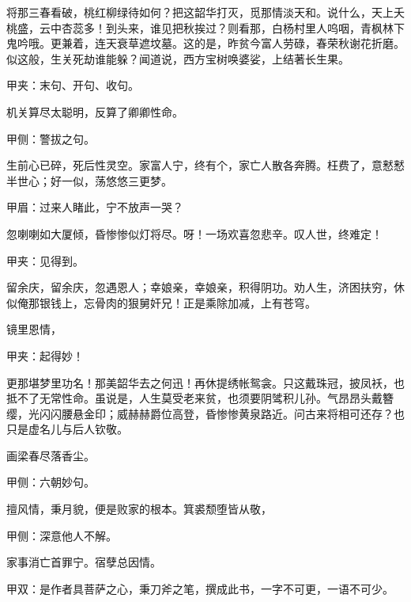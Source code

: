 \begin{qute}
    将那三春看破，桃红柳绿待如何？把这韶华打灭，觅那情淡天和。说什么，天上夭桃盛，云中杏蕊多！到头来，谁见把秋挨过？则看那，白杨村里人呜咽，青枫林下鬼吟哦。更兼着，连天衰草遮坟墓。这的是，昨贫今富人劳碌，春荣秋谢花折磨。似这般，生关死劫谁能躲？闻道说，西方宝树唤婆娑，上结著长生果。\begin{note}甲夹：末句、开句、收句。\end{note}
\end{qute}


\begin{qute}
    机关算尽太聪明，反算了卿卿性命。\begin{note}甲侧：警拔之句。\end{note}生前心已碎，死后性灵空。家富人宁，终有个，家亡人散各奔腾。枉费了，意慭慭半世心；好一似，荡悠悠三更梦。\begin{note}甲眉：过来人睹此，宁不放声一哭？\end{note}忽喇喇如大厦倾，昏惨惨似灯将尽。呀！一场欢喜忽悲辛。叹人世，终难定！\begin{note}甲夹：见得到。\end{note}
\end{qute}


\begin{qute}
    留余庆，留余庆，忽遇恩人；幸娘亲，幸娘亲，积得阴功。劝人生，济困扶穷，休似俺那银钱上，忘骨肉的狠舅奸兄！正是乘除加减，上有苍穹。
\end{qute}


\begin{qute}
    镜里恩情，\begin{note}甲夹：起得妙！\end{note}更那堪梦里功名！那美韶华去之何迅！再休提绣帐鸳衾。只这戴珠冠，披凤袄，也抵不了无常性命。虽说是，人生莫受老来贫，也须要阴骘积儿孙。气昂昂头戴簪缨，光闪闪腰悬金印；威赫赫爵位高登，昏惨惨黄泉路近。问古来将相可还存？也只是虚名儿与后人钦敬。
\end{qute}


\begin{qute}
    画梁春尽落香尘。\begin{note}甲侧：六朝妙句。\end{note}擅风情，秉月貌，便是败家的根本。箕裘颓堕皆从敬，\begin{note}甲侧：深意他人不解。\end{note}家事消亡首罪宁。宿孽总因情。\begin{note}甲双：是作者具菩萨之心，秉刀斧之笔，撰成此书，一字不可更，一语不可少。\end{note}
\end{qute}


